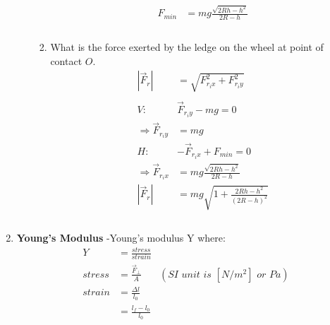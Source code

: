 \documentclass{article}
\begin{document}
\begin{enumerate}
\begin{enumerate}
\begin{enumerate}
                    \begin{align*}
                        F_{min}&=mg\frac{\sqrt{2Rh-h^2}}{2R-h} \\
                        \\
                    \end{align*} 
                    \item What is the force exerted by the ledge on the wheel at point of contact $O$.
                    \begin{align*}
                        |\vec{F}_r|&=\sqrt{F_{r_ix}^2+F_{r_iy}^2} \\
                        \\
                        V:&\vec{F}_{r_iy}-mg=0 \\
                        \Rightarrow\vec{F}_{r_iy}&=mg \\
                        H:&-\vec{F}_{r_ix}+F_{min}=0 \\
                        \Rightarrow\vec{F}_{r_ix}&=mg\frac{\sqrt{2Rh-h^2}}{2R-h} \\
                        |\vec{F}_r|&=mg\sqrt{1+\frac{2Rh-h^2}{(2R-h)^2}} \\
                        \\
                    \end{align*} 
                \end{enumerate}
            \end{enumerate}
            \item \textbf{Young's Modulus}
            -Young's modulus Y where:
            \begin{align*}
                Y&=\frac{stress}{strain} \\
                stress&=\frac{\vec{F}_{\perp}}{A}&(\textit{SI unit is $[N/m^2]$ or $Pa$}) \\
                strain&=\frac{\Delta l}{l_0} \\
                &=\frac{l_f-l_0}{l_0} \\
            \end{align*}
        \end{enumerate}
\end{document}
